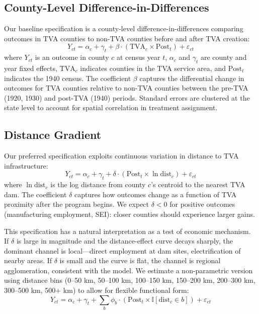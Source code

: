 \documentclass[12pt]{article}
\newcommand{\ind}{\mathbb{I}}
\begin{document}
\subsection{County-Level Difference-in-Differences}

Our baseline specification is a county-level difference-in-differences comparing outcomes in TVA counties to non-TVA counties before and after TVA creation:
\begin{equation}\label{eq:county_did}
Y_{ct} = \alpha_c + \gamma_t + \beta \cdot (\text{TVA}_c \times \text{Post}_t) + \varepsilon_{ct}
\end{equation}
where $Y_{ct}$ is an outcome in county $c$ at census year $t$, $\alpha_c$ and $\gamma_t$ are county and year fixed effects, $\text{TVA}_c$ indicates counties in the TVA service area, and $\text{Post}_t$ indicates the 1940 census. The coefficient $\beta$ captures the differential change in outcomes for TVA counties relative to non-TVA counties between the pre-TVA (1920, 1930) and post-TVA (1940) periods. Standard errors are clustered at the state level to account for spatial correlation in treatment assignment.

\subsection{Distance Gradient}

Our preferred specification exploits continuous variation in distance to TVA infrastructure:
\begin{equation}\label{eq:gradient}
Y_{ct} = \alpha_c + \gamma_t + \delta \cdot (\text{Post}_t \times \ln \text{dist}_c) + \varepsilon_{ct}
\end{equation}
where $\ln \text{dist}_c$ is the log distance from county $c$'s centroid to the nearest TVA dam. The coefficient $\delta$ captures how outcomes change as a function of TVA proximity after the program begins. We expect $\delta < 0$ for positive outcomes (manufacturing employment, SEI): closer counties should experience larger gains.

This specification has a natural interpretation as a test of economic mechanism. If $\delta$ is large in magnitude and the distance-effect curve decays sharply, the dominant channel is local---direct employment at dam sites, electrification of nearby areas. If $\delta$ is small and the curve is flat, the channel is regional agglomeration, consistent with the \citet{kline2014} model. We estimate a non-parametric version using distance bins (0--50 km, 50--100 km, 100--150 km, 150--200 km, 200--300 km, 300--500 km, 500+ km) to allow for flexible functional form:
\begin{equation}\label{eq:bins}
Y_{ct} = \alpha_c + \gamma_t + \sum_{b} \phi_b \cdot (\text{Post}_t \times \ind[\text{dist}_c \in b]) + \varepsilon_{ct}
\end{equation}
\end{document}
